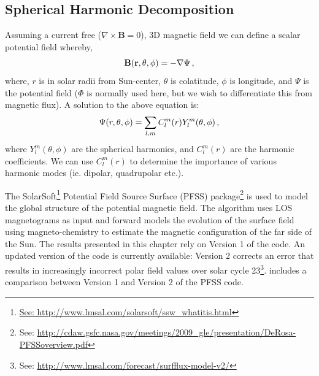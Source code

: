 
\subsection{Spherical Harmonic Decomposition}\label{sect:globsphhar}

Assuming a current free ($\nabla\times\mathbf{B}=0$), 3D magnetic field we can define a scalar potential field whereby,
\begin{equation}
\mathbf{B(r,\theta,\phi)}=-\nabla \Psi \mbox{\,,}
\end{equation}
where, $r$ is in solar radii from Sun-center, $\theta$ is colatitude, $\phi$ is longitude, and $\Psi$ is the potential field ($\Phi$ is normally used here, but we wish to differentiate this from magnetic flux). A solution to the above equation is:
\begin{equation}\label{eqn_harm_coeff}
\Psi(r,\theta,\phi)=\sum_{l,m}C_{l}^{m}(r)Y_{l}^{m}(\theta,\phi) \mbox{\,,}
\end{equation}
where $Y_{l}^{m}(\theta,\phi)$ are the spherical harmonics, and $C_{l}^{m}(r)$ are the harmonic coefficients. We can use $C_{l}^{m}(r)$ to determine the importance of various harmonic modes (ie. dipolar, quadrupolar etc.). 

The SolarSoft\footnote{\url{See: http://www.lmsal.com/solarsoft/ssw\_whatitis.html}} Potential Field Source Surface (PFSS) package\footnote{See: \url{http://cdaw.gsfc.nasa.gov/meetings/2009\_gle/presentation/DeRosa-PFSSoverview.pdf}} \citep{Schrijver:2003} is used to model the global structure of the potential magnetic field. The algorithm uses \gls{LOS} magnetograms as input and forward models the evolution of the surface field using magneto-chemistry \citep{Schrijver:2001} to estimate the magnetic configuration of the far side of the Sun. The results presented in this chapter rely on Version 1 of the code. An updated version of the code is currently available: Version 2 corrects an error that results in increasingly incorrect polar field values over solar cycle 23\footnote{See: \url{http://www.lmsal.com/forecast/surfflux-model-v2/}}.  includes a comparison between Version 1 and Version 2 of the PFSS code. 

